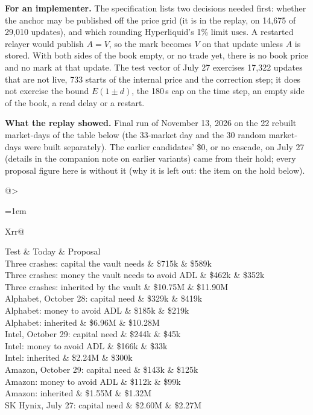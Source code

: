 \documentclass[10.5pt,a4paper]{article}
\newcommand{\res}[1]{\par\textbf{What the replay showed.} #1\par}
\begin{document}
\textbf{For an implementer.} The specification lists two decisions needed first: whether the anchor may be published off the price grid (it is in the replay, on 14{,}675 of 29{,}010 updates), and which rounding Hyperliquid's 1\% limit uses. A restarted relayer would publish $A = V$, so the mark becomes $V$ on that update unless $A$ is stored. With both sides of the book empty, or no trade yet, there is no book price and no mark at that update. The test vector of July 27 exercises 17{,}322 updates that are not live, 733 starts of the internal price and the correction step; it does not exercise the bound $E(1\pm d)$, the 180\,s cap on the time step, an empty side of the book, a read delay or a restart.
\res{Final run of November 13, 2026 on the 22 rebuilt market-days of the table below (the 33-market day and the 30 random market-days were built separately). The earlier candidates' \$0, or no cascade, on July 27 (details in the companion note on earlier variants) came from their hold; every proposal figure here is without it (why it is left out: the item on the hold below).\par
{\footnotesize\renewcommand{\arraystretch}{1.0}\begin{xltabular}{\textwidth}{@{}>{\raggedright\arraybackslash\hangindent=1em\hangafter=1}Xrr@{}}
\toprule
Test & Today & Proposal\\
\midrule
\endhead
Three crashes: capital the vault needs & \$715k & \$589k\\
Three crashes: money the vault needs to avoid ADL & \$462k & \$352k\\
Three crashes: inherited by the vault & \$10.75M & \$11.90M\\
\quad Alphabet, October 28: capital need & \$329k & \$419k\\
\quad Alphabet: money to avoid ADL & \$185k & \$219k\\
\quad Alphabet: inherited & \$6.96M & \$10.28M\\
\quad Intel, October 29: capital need & \$244k & \$45k\\
\quad Intel: money to avoid ADL & \$166k & \$33k\\
\quad Intel: inherited & \$2.24M & \$300k\\
\quad Amazon, October 29: capital need & \$143k & \$125k\\
\quad Amazon: money to avoid ADL & \$112k & \$99k\\
\quad Amazon: inherited & \$1.55M & \$1.32M\\
SK Hynix, July 27: capital need & \$2.60M & \$2.27M\\

\end{xltabular}}}
\end{document}
